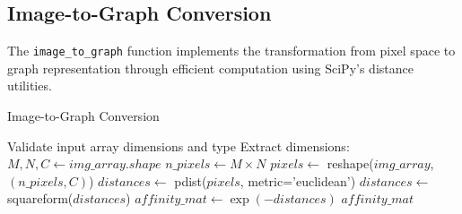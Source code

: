 \documentclass[12pt,a4paper]{article}
\begin{document}
\subsection{Image-to-Graph Conversion}
\label{subsec:image_to_graph_impl}

The \texttt{image\_to\_graph} function implements the transformation from pixel space to graph representation through efficient computation using SciPy's distance utilities.

\begin{algorithm}[H]
\caption{Image-to-Graph Conversion}
\begin{algorithmic}[1]
    \State Validate input array dimensions and type
    \State Extract dimensions: $M, N, C \gets img\_array.shape$
    \State $n\_pixels \gets M \times N$
    \State $pixels \gets$ reshape($img\_array$, $(n\_pixels, C)$) 
    \State $distances \gets$ pdist($pixels$, metric='euclidean') 
    \State $distances \gets$ squareform($distances$) 
    \State $affinity\_mat \gets \exp(-distances)$
    \State \Return $affinity\_mat$
\EndFunction
\end{algorithmic}
\end{algorithm}
\end{document}
